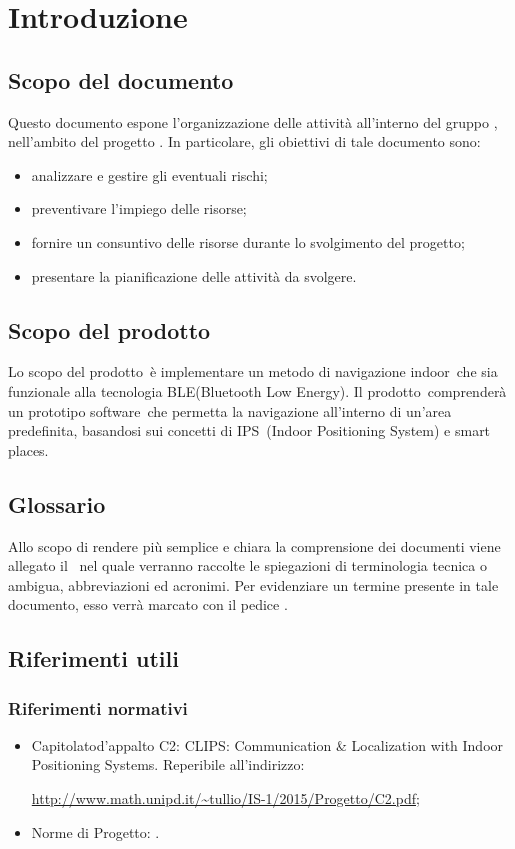\documentclass[../PianoProgetto.tex]{subfiles}
\begin{document}
\section{Introduzione}
	\subsection{Scopo del documento}
	Questo documento espone l'organizzazione delle attività all'interno del gruppo \leaf , nell'ambito del progetto \progetto \g .
In particolare, gli obiettivi di tale documento sono:
	\begin{itemize}
	\item analizzare e gestire gli eventuali rischi;
	\item preventivare l'impiego delle risorse;
	\item fornire un consuntivo delle risorse durante lo svolgimento del progetto;
	\item presentare la pianificazione delle attività da svolgere.
	\end{itemize}
	
	\subsection{Scopo del prodotto}
	Lo scopo del prodotto\g\ è implementare un metodo di navigazione indoor\g\ che sia funzionale alla tecnologia BLE\g (Bluetooth Low Energy).
	Il prodotto\g\ comprenderà un prototipo software\g\ che permetta la navigazione all'interno di un'area predefinita, basandosi sui concetti di IPS\g\ (Indoor Positioning System) e smart places\g.

	\subsection{Glossario}
		Allo scopo di rendere più semplice e chiara la comprensione dei documenti
viene allegato il \glossariov\ nel quale verranno raccolte le spiegazioni di
terminologia tecnica o ambigua, abbreviazioni ed acronimi. Per evidenziare
un termine presente in tale documento, esso verrà marcato con il pedice \g.


	\subsection{Riferimenti utili}

		\subsubsection{Riferimenti normativi}
		\begin{itemize}
		\item Capitolato\g d'appalto C2: CLIPS: Communication \& Localization with Indoor Positioning Systems. Reperibile all'indirizzo: \par
			\url{http://www.math.unipd.it/~tullio/IS-1/2015/Progetto/C2.pdf};
		\item Norme di Progetto: \normediprogettov.
		\end{itemize}
\end{document}
